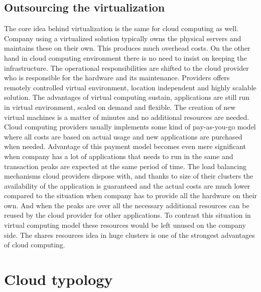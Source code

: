 \subsection{Outsourcing the virtualization}
\label{sub:Outsourcing the virtualization}

The core idea behind virtualization is the same for cloud computing as well. Company using a virtualized solution typically owns the physical servers and maintains these on their own. This produces much overhead costs. On the other hand in cloud computing environment there is no need to insist on keeping the infrastructure. The operational responsibilities are shifted to the cloud provider who is responsible for the hardware and its maintenance. Providers offers remotely controlled virtual environment, location independent and highly scalable solution. The advantages of virtual computing sustain, applications are still run in virtual environment, scaled on demand and flexible. The creation of new virtual machines is a matter of minutes and no additional resources are needed.
Cloud computing providers usually implements some kind of pay-as-you-go model where all costs are based on actual usage and new applications are purchased when needed. Advantage of this payment model becomes even mere significant when company has a lot of applications that needs to run in the same and transaction peaks are expected at the same period of time. The load balancing mechanisms cloud providers dispose with, and thanks to size of their clusters the availability of the application is guaranteed  and the actual costs are much lower compared to the situation when company has to provide all the hardware on their own. And when the peaks are over all the necessary additional resources can be reused by the cloud provider for other applications. To contrast this situation in virtual computing model these resources would be left unused on the company side. The shares resources idea in huge clusters is one of the strongest advantages of cloud computing.

\section{Cloud typology}
\label{sec:Cloud typology}

